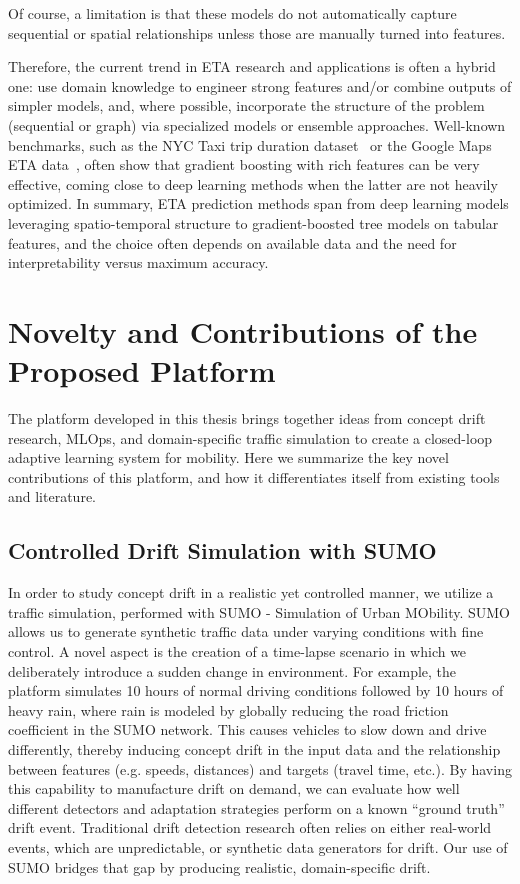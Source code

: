 Of course, a limitation is that these models do not automatically capture sequential or spatial relationships unless those are manually turned into features.

Therefore, the current trend in ETA research and applications is often a hybrid one: use domain knowledge to engineer strong features and/or combine outputs of simpler models, and, where possible, incorporate the structure of the problem (sequential or graph) via specialized models or ensemble approaches.
Well-known benchmarks, such as the NYC Taxi trip duration dataset~\cite{nyctaxikaggle} or the Google Maps ETA data~\cite{derrowpinion2021gmapseta}, often show that gradient boosting with rich features can be very effective, coming close to deep learning methods when the latter are not heavily optimized.
In summary, ETA prediction methods span from deep learning models leveraging spatio-temporal structure to gradient-boosted tree models on tabular features, and the choice often depends on available data and the need for interpretability versus maximum accuracy.

\section{Novelty and Contributions of the Proposed Platform}

The platform developed in this thesis brings together ideas from concept drift research, MLOps, and domain-specific traffic simulation to create a closed-loop adaptive learning system for mobility.
Here we summarize the key novel contributions of this platform, and how it differentiates itself from existing tools and literature.

\subsection{Controlled Drift Simulation with SUMO}
In order to study concept drift in a realistic yet controlled manner, we utilize a traffic simulation, performed with SUMO - Simulation of Urban MObility.
SUMO allows us to generate synthetic traffic data under varying conditions with fine control.
A novel aspect is the creation of a time-lapse scenario in which we deliberately introduce a sudden change in environment.
For example, the platform simulates 10 hours of normal driving conditions followed by 10 hours of heavy rain, where rain is modeled by globally reducing the road friction coefficient in the SUMO network.
This causes vehicles to slow down and drive differently, thereby inducing concept drift in the input data and the relationship between features (e.g. speeds, distances) and targets (travel time, etc.).
By having this capability to manufacture drift on demand, we can evaluate how well different detectors and adaptation strategies perform on a known ``ground truth'' drift event.
Traditional drift detection research often relies on either real-world events, which are unpredictable, or synthetic data generators for drift.
Our use of SUMO bridges that gap by producing realistic, domain-specific drift.

